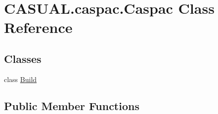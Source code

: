 \hypertarget{classCASUAL_1_1caspac_1_1Caspac}{\section{C\-A\-S\-U\-A\-L.\-caspac.\-Caspac Class Reference}
\label{classCASUAL_1_1caspac_1_1Caspac}
}
\subsection*{Classes}
\begin{DoxyCompactItemize}
\item 
class \hyperlink{classCASUAL_1_1caspac_1_1Caspac_1_1Build}{Build}
\end{DoxyCompactItemize}
\subsection*{Public Member Functions}
